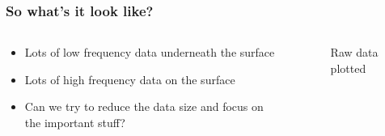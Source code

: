 \documentclass[pdf,8pt]{beamer}
\newcommand\Split[2]{
    \begin{minipage}[b][0.35\textheight][t]{0.8\textwidth}#1\end{minipage}\\[2.0em]
    \begin{minipage}[b][0.35\textheight][t]{0.8\textwidth}#2\end{minipage}
}
\begin{document}
\begin{frame}
\frametitle{So what's it look like?}
\begin{columns}
\begin{column}{0.29\paperwidth}
\begin{itemize}
    \item Lots of low frequency data underneath the surface
    \item Lots of high frequency data on the surface
    \item Can we try to reduce the data size and focus on the important stuff?
\end{itemize}
\end{column}
\begin{column}{0.70\paperwidth}
\begin{figure}[h!]
\begin{center}
    \caption{Raw data plotted}
\end{center}
\end{figure}
\end{column} %
\end{columns}
\end{frame}
\end{document}
